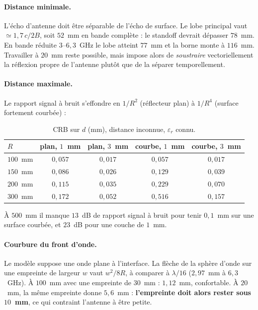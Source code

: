 \documentclass[11pt,a4paper]{article}
\newcommand{\eps}{\varepsilon_r}
\begin{document}
\paragraph{Distance minimale.} L'écho d'antenne doit être séparable de l'écho de
surface. Le lobe principal vaut $\simeq 1{,}7\,c/2B$, soit $52$~mm en bande
complète : le standoff devrait dépasser $78$~mm. En bande réduite
$3$--$6{,}3$~GHz le lobe atteint $77$~mm et la borne monte à $116$~mm.
Travailler à $20$~mm reste possible, mais impose alors de \emph{soustraire}
vectoriellement la réflexion propre de l'antenne plutôt que de la séparer
temporellement.

\paragraph{Distance maximale.} Le rapport signal à bruit s'effondre en $1/R^2$
(réflecteur plan) à $1/R^4$ (surface fortement courbée) :

\begin{table}[h]
\centering
\caption{CRB sur $d$ (mm), distance inconnue, $\eps$ connu.}
\begin{tabular}{lcccc}
\toprule
$R$ & plan, $1$~mm & plan, $3$~mm & courbe, $1$~mm & courbe, $3$~mm \\
\midrule
$100$~mm & $0{,}057$ & $0{,}017$ & $0{,}057$ & $0{,}017$ \\
$150$~mm & $0{,}086$ & $0{,}026$ & $0{,}129$ & $0{,}039$ \\
$200$~mm & $0{,}115$ & $0{,}035$ & $0{,}229$ & $0{,}070$ \\
$300$~mm & $0{,}172$ & $0{,}052$ & $0{,}516$ & $0{,}157$ \\
\bottomrule
\end{tabular}
\end{table}

À $500$~mm il manque $13$~dB de rapport signal à bruit pour tenir $0{,}1$~mm sur
une surface courbée, et $23$~dB pour une couche de $1$~mm.

\paragraph{Courbure du front d'onde.} Le modèle suppose une onde plane à
l'interface. La flèche de la sphère d'onde sur une empreinte de largeur $w$ vaut
$w^2/8R$, à comparer à $\lambda/16$ ($2{,}97$~mm à $6{,}3$~GHz). À $100$~mm avec
une empreinte de $30$~mm : $1{,}12$~mm, confortable. À $20$~mm, la même empreinte
donne $5{,}6$~mm : \textbf{l'empreinte doit alors rester sous $10$~mm}, ce qui
contraint l'antenne à être petite.
\end{document}
